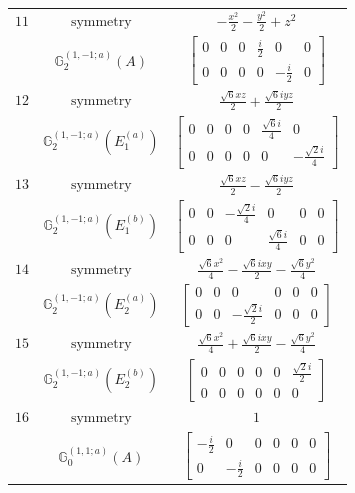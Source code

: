 \documentclass[fleqn,8pt,landscape]{jsarticle}
\begin{document}
\begin{longtable}{ccc}
$ 11 $ & $ \text{symmetry} $ & $ - \frac{x^{2}}{2} - \frac{y^{2}}{2} + z^{2} $ \\
$  $ & $ \mathbb{G}_{2}^{(1,-1;a)}(A) $ & $ \begin{bmatrix} 0 & 0 & 0 & \frac{i}{2} & 0 & 0 \\ 0 & 0 & 0 & 0 & - \frac{i}{2} & 0 \end{bmatrix} $ \\ \hline
$ 12 $ & $ \text{symmetry} $ & $ \frac{\sqrt{6} x z}{2} + \frac{\sqrt{6} i y z}{2} $ \\
$  $ & $ \mathbb{G}_{2}^{(1,-1;a)}(E_{1}^{(a)}) $ & $ \begin{bmatrix} 0 & 0 & 0 & 0 & \frac{\sqrt{6} i}{4} & 0 \\ 0 & 0 & 0 & 0 & 0 & - \frac{\sqrt{2} i}{4} \end{bmatrix} $ \\ \hline
$ 13 $ & $ \text{symmetry} $ & $ \frac{\sqrt{6} x z}{2} - \frac{\sqrt{6} i y z}{2} $ \\
$  $ & $ \mathbb{G}_{2}^{(1,-1;a)}(E_{1}^{(b)}) $ & $ \begin{bmatrix} 0 & 0 & - \frac{\sqrt{2} i}{4} & 0 & 0 & 0 \\ 0 & 0 & 0 & \frac{\sqrt{6} i}{4} & 0 & 0 \end{bmatrix} $ \\ \hline
$ 14 $ & $ \text{symmetry} $ & $ \frac{\sqrt{6} x^{2}}{4} - \frac{\sqrt{6} i x y}{2} - \frac{\sqrt{6} y^{2}}{4} $ \\
$  $ & $ \mathbb{G}_{2}^{(1,-1;a)}(E_{2}^{(a)}) $ & $ \begin{bmatrix} 0 & 0 & 0 & 0 & 0 & 0 \\ 0 & 0 & - \frac{\sqrt{2} i}{2} & 0 & 0 & 0 \end{bmatrix} $ \\ \hline
$ 15 $ & $ \text{symmetry} $ & $ \frac{\sqrt{6} x^{2}}{4} + \frac{\sqrt{6} i x y}{2} - \frac{\sqrt{6} y^{2}}{4} $ \\
$  $ & $ \mathbb{G}_{2}^{(1,-1;a)}(E_{2}^{(b)}) $ & $ \begin{bmatrix} 0 & 0 & 0 & 0 & 0 & \frac{\sqrt{2} i}{2} \\ 0 & 0 & 0 & 0 & 0 & 0 \end{bmatrix} $ \\ \hline
$ 16 $ & $ \text{symmetry} $ & $ 1 $ \\
$  $ & $ \mathbb{G}_{0}^{(1,1;a)}(A) $ & $ \begin{bmatrix} - \frac{i}{2} & 0 & 0 & 0 & 0 & 0 \\ 0 & - \frac{i}{2} & 0 & 0 & 0 & 0 \end{bmatrix} $ \\ \hline

\end{longtable}
\end{document}
